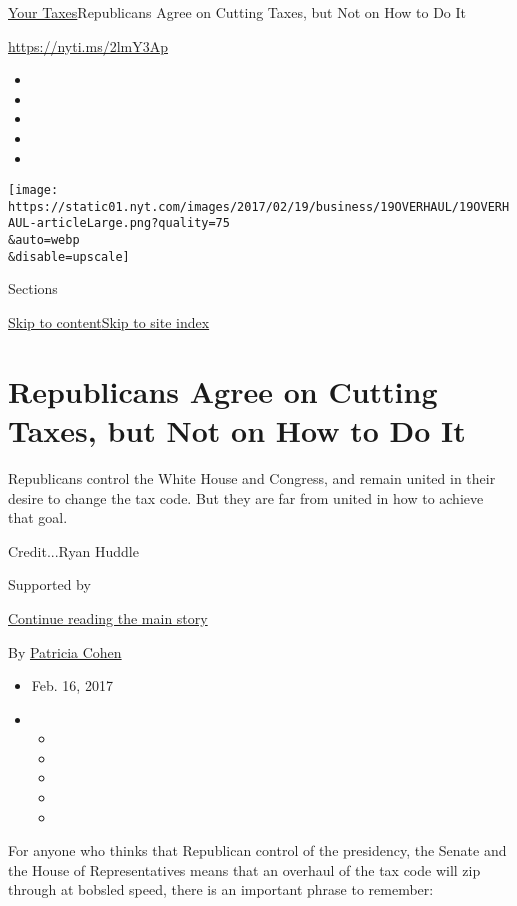 \href{/pages/business/yourtaxes/index.html}{Your
Taxes}\textbar{}Republicans Agree on Cutting Taxes, but Not on How to Do
It

\url{https://nyti.ms/2lmY3Ap}

\begin{itemize}
\item
\item
\item
\item
\item
\end{itemize}

\texttt{[image: https://static01.nyt.com/images/2017/02/19/business/19OVERHAUL/19OVERHAUL-articleLarge.png?quality=75\\\&auto=webp\\\&disable=upscale]}

Sections

\protect\hyperlink{site-content}{Skip to
content}\protect\hyperlink{site-index}{Skip to site index}

\hypertarget{republicans-agree-on-cutting-taxes-but-not-on-how-to-do-it}{%
\section{Republicans Agree on Cutting Taxes, but Not on How to Do
It}\label{republicans-agree-on-cutting-taxes-but-not-on-how-to-do-it}}

Republicans control the White House and Congress, and remain united in
their desire to change the tax code. But they are far from united in how
to achieve that goal.

Credit...Ryan Huddle

Supported by

\protect\hyperlink{after-sponsor}{Continue reading the main story}

By \href{http://www.nytimes.com/by/patricia-cohen}{Patricia Cohen}

\begin{itemize}
\item
  Feb. 16, 2017
\item
  \begin{itemize}
  \item
  \item
  \item
  \item
  \item
  \end{itemize}
\end{itemize}

For anyone who thinks that Republican control of the presidency, the
Senate and the House of Representatives means that an overhaul of the
tax code will zip through at bobsled speed, there is an important phrase
to remember:

